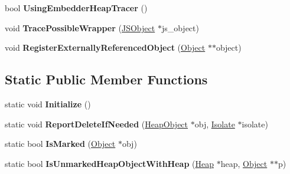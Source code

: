 \begin{DoxyCompactItemize}
\item 
bool {\bfseries Using\+Embedder\+Heap\+Tracer} ()\hypertarget{classv8_1_1internal_1_1_mark_compact_collector_ac7e6b4ec906073036d3f97c10e2cef97}{}\label{classv8_1_1internal_1_1_mark_compact_collector_ac7e6b4ec906073036d3f97c10e2cef97}

\item 
void {\bfseries Trace\+Possible\+Wrapper} (\hyperlink{classv8_1_1internal_1_1_j_s_object}{J\+S\+Object} $\ast$js\+\_\+object)\hypertarget{classv8_1_1internal_1_1_mark_compact_collector_ada662f2e3af724a24b16cb1d550823e5}{}\label{classv8_1_1internal_1_1_mark_compact_collector_ada662f2e3af724a24b16cb1d550823e5}

\item 
void {\bfseries Register\+Externally\+Referenced\+Object} (\hyperlink{classv8_1_1internal_1_1_object}{Object} $\ast$$\ast$object)\hypertarget{classv8_1_1internal_1_1_mark_compact_collector_aa78dbde5e59af33ba9b268d5f36aeaa1}{}\label{classv8_1_1internal_1_1_mark_compact_collector_aa78dbde5e59af33ba9b268d5f36aeaa1}

\end{DoxyCompactItemize}
\subsection*{Static Public Member Functions}
\begin{DoxyCompactItemize}
\item 
static void {\bfseries Initialize} ()\hypertarget{classv8_1_1internal_1_1_mark_compact_collector_ab188f2bac8de14eac502672e08f84313}{}\label{classv8_1_1internal_1_1_mark_compact_collector_ab188f2bac8de14eac502672e08f84313}

\item 
static void {\bfseries Report\+Delete\+If\+Needed} (\hyperlink{classv8_1_1internal_1_1_heap_object}{Heap\+Object} $\ast$obj, \hyperlink{classv8_1_1internal_1_1_isolate}{Isolate} $\ast$isolate)\hypertarget{classv8_1_1internal_1_1_mark_compact_collector_aad0e653147aeef79f82421b877a59ca0}{}\label{classv8_1_1internal_1_1_mark_compact_collector_aad0e653147aeef79f82421b877a59ca0}

\item 
static bool {\bfseries Is\+Marked} (\hyperlink{classv8_1_1internal_1_1_object}{Object} $\ast$obj)\hypertarget{classv8_1_1internal_1_1_mark_compact_collector_a5270a5fd9f88e28b30ce5022c343ad79}{}\label{classv8_1_1internal_1_1_mark_compact_collector_a5270a5fd9f88e28b30ce5022c343ad79}

\item 
static bool {\bfseries Is\+Unmarked\+Heap\+Object\+With\+Heap} (\hyperlink{classv8_1_1internal_1_1_heap}{Heap} $\ast$heap, \hyperlink{classv8_1_1internal_1_1_object}{Object} $\ast$$\ast$p)\hypertarget{classv8_1_1internal_1_1_mark_compact_collector_a9cafdbe6ef6a47b198a714142f2885cd}{}\label{classv8_1_1internal_1_1_mark_compact_collector_a9cafdbe6ef6a47b198a714142f2885cd}

\end{DoxyCompactItemize}
